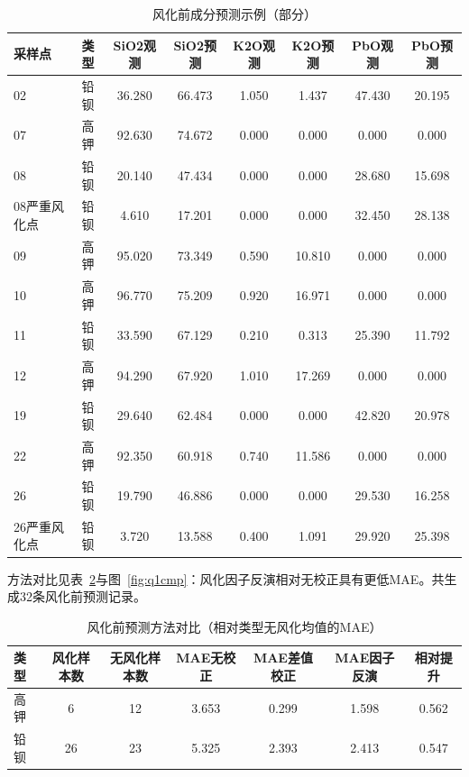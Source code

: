 \documentclass[UTF8,a4paper,12pt]{ctexart}
\begin{document}
\begin{table}[H]
\centering
\caption{风化前成分预测示例（部分）}
\label{tab:pre}
\scriptsize
\begin{tabular}{lccccccc}
\toprule
采样点 & 类型 & SiO2观测 & SiO2预测 & K2O观测 & K2O预测 & PbO观测 & PbO预测 \\
\hline
02 & 铅钡 & 36.280 & 66.473 & 1.050 & 1.437 & 47.430 & 20.195 \\
07 & 高钾 & 92.630 & 74.672 & 0.000 & 0.000 & 0.000 & 0.000 \\
08 & 铅钡 & 20.140 & 47.434 & 0.000 & 0.000 & 28.680 & 15.698 \\
08严重风化点 & 铅钡 & 4.610 & 17.201 & 0.000 & 0.000 & 32.450 & 28.138 \\
09 & 高钾 & 95.020 & 73.349 & 0.590 & 10.810 & 0.000 & 0.000 \\
10 & 高钾 & 96.770 & 75.209 & 0.920 & 16.971 & 0.000 & 0.000 \\
11 & 铅钡 & 33.590 & 67.129 & 0.210 & 0.313 & 25.390 & 11.792 \\
12 & 高钾 & 94.290 & 67.920 & 1.010 & 17.269 & 0.000 & 0.000 \\
19 & 铅钡 & 29.640 & 62.484 & 0.000 & 0.000 & 42.820 & 20.978 \\
22 & 高钾 & 92.350 & 60.918 & 0.740 & 11.586 & 0.000 & 0.000 \\
26 & 铅钡 & 19.790 & 46.886 & 0.000 & 0.000 & 29.530 & 16.258 \\
26严重风化点 & 铅钡 & 3.720 & 13.588 & 0.400 & 1.091 & 29.920 & 25.398 \\
\bottomrule
\end{tabular}
\end{table}

方法对比见表~\ref{tab:cmp1}与图~\ref{fig:q1cmp}：风化因子反演相对无校正具有更低MAE。共生成32条风化前预测记录。

\begin{table}[H]
\centering
\caption{风化前预测方法对比（相对类型无风化均值的MAE）}
\label{tab:cmp1}
\scriptsize
\begin{tabular}{lcccccc}
\toprule
类型 & 风化样本数 & 无风化样本数 & MAE无校正 & MAE差值校正 & MAE因子反演 & 相对提升 \\
\hline
高钾 & 6 & 12 & 3.653 & 0.299 & 1.598 & 0.562 \\
铅钡 & 26 & 23 & 5.325 & 2.393 & 2.413 & 0.547 \\
\bottomrule
\end{tabular}
\end{table}
\end{document}
